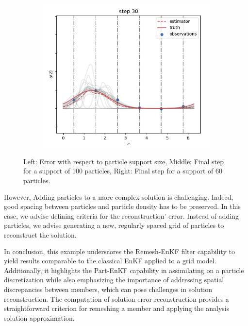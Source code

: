 \begin{figure}
\begin{subfigure}{0.29\textwidth}
		\includegraphics[width=\textwidth]{images/app1d/error_support/not_ok.png}
		\label{error_support3}
	\end{subfigure}
	\caption{Left: Error with respect to particle support size, Middle: Final step for a support of 100 particles, Right: Final step for a support of 60 particles.}
	\label{error_support}
\end{figure}
However, Adding particles to a more complex solution is challenging. Indeed, good spacing between particles and particle density has to be preserved. In this case, we advise defining criteria for the reconstruction' error. Instead of adding particles, we advise generating a new, regularly spaced grid of particles to reconstruct the solution.

In conclusion, this example underscores the Remesh-EnKF filter capability to yield results comparable to the classical EnKF applied to a grid model. Additionally, it highlights the Part-EnKF capability in assimilating on a particle discretization while also emphasizing the importance of addressing spatial discrepancies between members, which can pose challenges in solution reconstruction. The computation of solution error reconstruction provides a straightforward criterion for remeshing a member and applying the analysis solution approximation.


\newpage